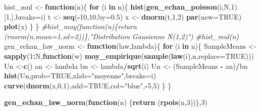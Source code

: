\documentclass[]{article}
\newenvironment{Shaded}{\begin{snugshade}}{\end{snugshade}}
\newcommand{\CommentTok}[1]{\textcolor[rgb]{0.56,0.35,0.01}{\textit{#1}}}
\newcommand{\ControlFlowTok}[1]{\textcolor[rgb]{0.13,0.29,0.53}{\textbf{#1}}}
\newcommand{\DataTypeTok}[1]{\textcolor[rgb]{0.13,0.29,0.53}{#1}}
\newcommand{\DecValTok}[1]{\textcolor[rgb]{0.00,0.00,0.81}{#1}}
\newcommand{\FloatTok}[1]{\textcolor[rgb]{0.00,0.00,0.81}{#1}}
\newcommand{\KeywordTok}[1]{\textcolor[rgb]{0.13,0.29,0.53}{\textbf{#1}}}
\newcommand{\NormalTok}[1]{#1}
\newcommand{\OperatorTok}[1]{\textcolor[rgb]{0.81,0.36,0.00}{\textbf{#1}}}
\newcommand{\OtherTok}[1]{\textcolor[rgb]{0.56,0.35,0.01}{#1}}
\newcommand{\StringTok}[1]{\textcolor[rgb]{0.31,0.60,0.02}{#1}}
\begin{document}
\begin{Shaded}
\begin{Highlighting}[]
\NormalTok{hist_mul <-}\StringTok{ }\ControlFlowTok{function}\NormalTok{(n)\{}
  \ControlFlowTok{for}\NormalTok{ (i }\ControlFlowTok{in}\NormalTok{ n)\{}
    \KeywordTok{hist}\NormalTok{(}\KeywordTok{gen_echan_poisson}\NormalTok{(i,N,}\DecValTok{1}\NormalTok{)[}\DecValTok{1}\NormalTok{,],}\DataTypeTok{breaks=}\NormalTok{i)}
\NormalTok{    t <-}\StringTok{ }\KeywordTok{seq}\NormalTok{(}\OperatorTok{-}\DecValTok{10}\NormalTok{,}\DecValTok{10}\NormalTok{,}\DataTypeTok{by=}\FloatTok{0.5}\NormalTok{)}
\NormalTok{x <-}\StringTok{ }\KeywordTok{dnorm}\NormalTok{(t,}\DecValTok{1}\NormalTok{,}\DecValTok{2}\NormalTok{)}
\KeywordTok{par}\NormalTok{(}\DataTypeTok{new=}\OtherTok{TRUE}\NormalTok{)}
\KeywordTok{plot}\NormalTok{(x)}
\NormalTok{  \}}
\NormalTok{\}}
\CommentTok{#hist_moy(function(n)\{return (rnorm(n,mean=1,sd=2))\},"Distribution Gausienne N(1,2)")}
\CommentTok{#hist_mul(n)}
\NormalTok{gen_echan_law_norm <-}\StringTok{ }\ControlFlowTok{function}\NormalTok{(law,lambda)\{}
  \ControlFlowTok{for}\NormalTok{ (i }\ControlFlowTok{in}\NormalTok{ n)\{}
\NormalTok{    SampleMeans <-}\StringTok{ }\KeywordTok{sapply}\NormalTok{(}\DecValTok{1}\OperatorTok{:}\NormalTok{N,}\ControlFlowTok{function}\NormalTok{(w) }\KeywordTok{moy_empirique}\NormalTok{(}\KeywordTok{sample}\NormalTok{(}\KeywordTok{law}\NormalTok{(i),n,}\DataTypeTok{replace=}\OtherTok{TRUE}\NormalTok{)))}
\NormalTok{    Un <-}\KeywordTok{c}\NormalTok{()}
\NormalTok{    an <-}\StringTok{ }\NormalTok{lambda}
\NormalTok{    bn <-}\StringTok{ }\NormalTok{lambda}\OperatorTok{/}\KeywordTok{sqrt}\NormalTok{(i)}
\NormalTok{    Un <-}\StringTok{ }\NormalTok{(SampleMeans }\OperatorTok{-}\StringTok{ }\NormalTok{an)}\OperatorTok{/}\NormalTok{bn }
    \KeywordTok{hist}\NormalTok{(Un,}\DataTypeTok{prob=}\OtherTok{TRUE}\NormalTok{,}\DataTypeTok{xlab=}\StringTok{"moyenne"}\NormalTok{,}\DataTypeTok{breaks=}\NormalTok{i)}
    \KeywordTok{curve}\NormalTok{(}\KeywordTok{dnorm}\NormalTok{(x,}\DecValTok{0}\NormalTok{,}\DecValTok{1}\NormalTok{),}\DataTypeTok{add=}\OtherTok{TRUE}\NormalTok{,}\DataTypeTok{col=}\StringTok{"blue"}\NormalTok{,}\OperatorTok{-}\DecValTok{5}\NormalTok{,}\DecValTok{5}\NormalTok{)}
\NormalTok{  \}}
\NormalTok{\}}

\KeywordTok{gen_echan_law_norm}\NormalTok{(}\ControlFlowTok{function}\NormalTok{(n) \{}\KeywordTok{return}\NormalTok{ (}\KeywordTok{rpois}\NormalTok{(n,}\DecValTok{3}\NormalTok{))\},}\DecValTok{3}\NormalTok{)}
\end{Highlighting}
\end{Shaded}
\end{document}
